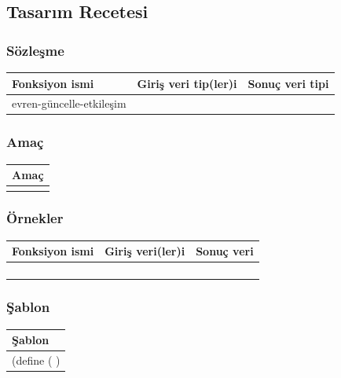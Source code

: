 \documentclass[12pt, a4paper]{article}
\newcommand\fillin[1][3cm]{\makebox[#1]{\dotfill}}
\begin{document}




\newpage
\subsection*{Tasarım Recetesi}
\subsubsection*{Sözleşme}
\begin{tabular}{| p{4cm} | p{8cm} | p{4cm} |  }
\hline			
Fonksiyon ismi&Giriş veri tip(ler)i&Sonuç veri tipi\\
\hline
evren-güncelle-etkileşim& & \\[10ex]
\hline  
\end{tabular}

\subsubsection*{Amaç}
\begin{tabular}{| p{17cm} |  }
\hline			
Amaç\\
\hline
 \\[10ex]
\hline  
\end{tabular}

\subsubsection*{Örnekler}
\begin{tabular}{| p{4cm} | p{8cm} | p{4cm} |  }
\hline			
Fonksiyon ismi&Giriş veri(ler)i&Sonuç veri\\
\hline
& & \\[6ex]
\hline  
& & \\[6ex]
\hline  
& & \\[6ex]
\hline  
& & \\[6ex]
\hline  
\end{tabular}

\subsubsection*{Şablon}
\begin{tabular}{| p{17cm} |  }
\hline			
Şablon\\
\hline
\vspace{0,2cm}
(define (\fillin[2cm] \hspace{1cm}  \fillin[8cm] ) \\[30ex]
\hline  
\end{tabular}
\end{document}
